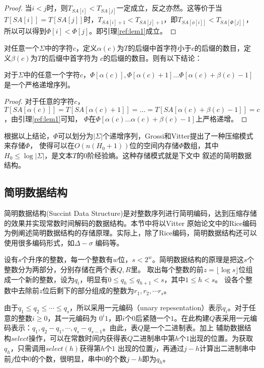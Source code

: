 \begin{proof}
    当$i<j$时，则$T_{SA[i]}<T_{SA[j]}$一定成立，反之亦然。这等价于当$T[SA[i]]=T[SA[j]]$时，$T_{SA[i]+1}<T_{SA[j]+1}$，即$T_{SA[\phi[i]]}<T_{SA[\Phi[j]]}$，
    所以可以得到$\Phi[i]<\Phi[j]$。即引理\ref{ref:lem1}成立。
\end{proof}

对任意一个$\Sigma$中的字符$c$，定义$\alpha(c)$为$T$的后缀中首字符小于$c$的后缀的数目，定义$\beta(c)$为$T$的后缀中首字符为
$c$的后缀的数目。则有以下结论：

\begin{cor}\label{cor1}
对于$\Sigma$中的任意一个字符$c$，$\Phi[\alpha(c)], \Phi[\alpha(c)+1] \ldots \Phi[\alpha(c)+\beta(c)− 1]$是一个严格递增序列。
\end{cor}

\begin{proof}
    对于任意的字符$c$，$T[SA[\alpha(c)]]=T[SA[\alpha(c)+1]]=\ldots =T[SA[\alpha(c)+\beta(c)-1]]=c$，由引理\ref{ref:lem1}可知，
    $\Phi$在$\Phi[\alpha(c)\ldots \alpha(c)+\beta(c)-1]$上严格递增。
\end{proof}

根据以上结论，$\Phi$可以划分为$|\Sigma|$个递增序列，Grossi和Vitter\cite{grossi2005compressed}提出了一种压缩模式来存储$\Phi$，
使得可以在$O(n(H_0+1))$位的空间内存储$\Phi$数组，其中$H_0 \leq \log |\Sigma|$，是文本$T$的0阶经验熵。这种存储模式就是下文中
叙述的简明数据结构。

\subsection{简明数据结构}

简明数据结构(Succint Data Structure)是对整数序列进行简明编码，达到压缩存储的效果并实现常数时间解码的数据结构。本节中将以Vitter
原始论文中的Rice编码为例阐述简明数据结构的存储原理。实际上，除了Rice编码，简明数据结构还可以使用很多编码形式，如$\Delta-\sigma$
编码等。

设有$s$个升序的整数，每一个整数有$w$位，$s<2^w$。简明数据结构的原理是把这$s$个整数分为两部分，分别存储在两个表$Q,R$里。
取出每个整数的前$z=\lfloor \log s\rfloor $位组成一个新的整数，设为$q_i$，明显有$0 \leq q_h \leq q_{h+1} < s$，其中$1 \leq h < s$。
设各个整数中去除前$z$位后剩下的部分组成的整数为$r_1,r_2,\cdots r_s$。

由于$q_1 \leq q_2 \leq \cdots \leq q_s$，所以采用一元编码（unary repesentation）表示$q_i$。对于任意的整数$i \geq 0$，其一元编码为
$0^i1$，即$i$个$0$后紧随一个$1$。在此构建$Q$表采用一元编码表示：$q_1,q_2-q_1,\cdots ,q_s-q_{s-1}$。由此，表$Q$是一个二进制表。加上
辅助数据结构$select$操作，可以在常数时间内获得表$Q$二进制串中第$h$个$1$出现的位置。为获取$q_h$，只需调用$select(h)$获得第$h$个$1$
出现的位置$j$，再通过$j-h$计算出二进制串中前$j$位中$0$的个数，很明显，串中$0$的个数$j-h$即为$q_h$。

